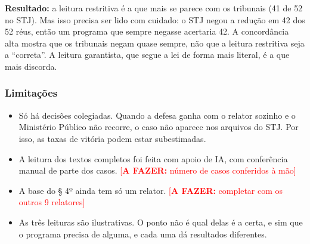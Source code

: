 \documentclass[11pt,a4paper]{article}
\newcommand{\todo}[1]{\textcolor{red}{[\textbf{A FAZER:} #1]}}
\begin{document}


\textbf{Resultado:} a leitura restritiva é a que mais se parece com os tribunais (41 de 52
no STJ). Mas isso precisa ser lido com cuidado: o STJ negou a redução em 42 dos 52 réus, então
um programa que sempre negasse acertaria 42. A concordância alta mostra que os tribunais
negam quase sempre, não que a leitura restritiva seja a ``correta''. A leitura garantista,
que segue a lei de forma mais literal, é a que mais discorda.

\subsubsection*{Limitações}

\begin{itemize}
  \item Só há decisões colegiadas. Quando a defesa ganha com o relator sozinho e o Ministério
        Público não recorre, o caso não aparece nos arquivos do STJ. Por isso, as taxas de
        vitória podem estar subestimadas.
  \item A leitura dos textos completos foi feita com apoio de IA, com conferência manual
        de parte dos casos. \todo{número de casos conferidos à mão}
  \item A base do § 4º ainda tem só um relator. \todo{completar com os outros 9 relatores}
  \item As três leituras são ilustrativas. O ponto não é qual delas é a certa, e sim que o
        programa precisa de alguma, e cada uma dá resultados diferentes.
\end{itemize}
\end{document}
